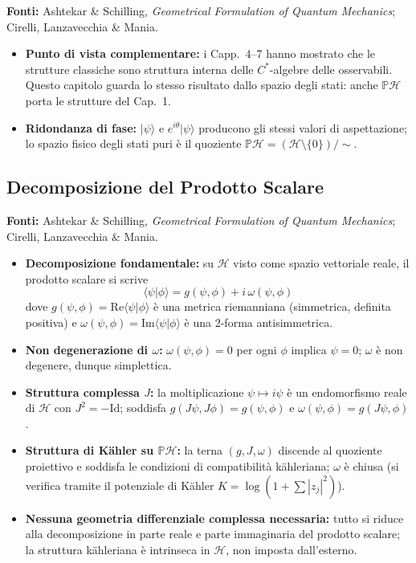 \documentclass[12pt, a4paper]{article}
\newcommand{\fonti}[1]{%
	\begin{fontebox}
		\textcolor{fontecolor}{\footnotesize\textbf{Fonti:} #1}
	\end{fontebox}%
}
\begin{document}
	\fonti{Ashtekar \& Schilling, \textit{Geometrical Formulation of Quantum Mechanics};
		Cirelli, Lanzavecchia \& Mania.}
	
	\begin{itemize}
		\item \textbf{Punto di vista complementare:} i Capp.\ 4--7 hanno mostrato che
		le strutture classiche sono struttura interna delle $C^*$-algebre delle osservabili.
		Questo capitolo guarda lo stesso risultato dallo spazio degli stati: anche
		$\mathbb{P}\mathcal{H}$ porta le strutture del Cap.\ 1.
		\item \textbf{Ridondanza di fase:} $|\psi\rangle$ e $e^{i\theta}|\psi\rangle$
		producono gli stessi valori di aspettazione; lo spazio fisico degli stati puri è
		il quoziente $\mathbb{P}\mathcal{H} = (\mathcal{H} \setminus \{0\})/\sim$.
	\end{itemize}
	
	\subsection{Decomposizione del Prodotto Scalare}
	
	\fonti{Ashtekar \& Schilling, \textit{Geometrical Formulation of Quantum Mechanics};
		Cirelli, Lanzavecchia \& Mania.}
	
	\begin{itemize}
		\item \textbf{Decomposizione fondamentale:} su $\mathcal{H}$ visto come spazio
		vettoriale reale, il prodotto scalare si scrive
		\[
		\langle\psi|\phi\rangle = g(\psi,\phi) + i\,\omega(\psi,\phi)
		\]
		dove $g(\psi,\phi) = \mathrm{Re}\langle\psi|\phi\rangle$ è una metrica riemanniana
		(simmetrica, definita positiva) e $\omega(\psi,\phi) = \mathrm{Im}\langle\psi|\phi\rangle$
		è una 2-forma antisimmetrica.
		\item \textbf{Non degenerazione di $\omega$:} $\omega(\psi,\phi) = 0$ per ogni
		$\phi$ implica $\psi = 0$; $\omega$ è non degenere, dunque simplettica.
		\item \textbf{Struttura complessa $J$:} la moltiplicazione $\psi \mapsto i\psi$
		è un endomorfismo reale di $\mathcal{H}$ con $J^2 = -\mathrm{Id}$; soddisfa
		$g(J\psi, J\phi) = g(\psi,\phi)$ e $\omega(\psi,\phi) = g(J\psi,\phi)$.
		\item \textbf{Struttura di Kähler su $\mathbb{P}\mathcal{H}$:} la terna
		$(g, J, \omega)$ discende al quoziente proiettivo e soddisfa le condizioni di
		compatibilità kähleriana; $\omega$ è chiusa (si verifica tramite il potenziale
		di Kähler $K = \log(1 + \sum|z_j|^2)$).
		\item \textbf{Nessuna geometria differenziale complessa necessaria:} tutto si
		riduce alla decomposizione in parte reale e parte immaginaria del prodotto scalare;
		la struttura kähleriana è intrinseca in $\mathcal{H}$, non imposta dall'esterno.
	\end{itemize}
	
\end{document}
